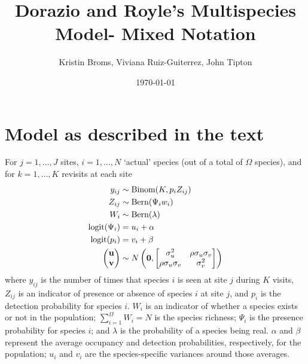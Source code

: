 \documentclass[fleqn]{article}
\title{Dorazio and Royle's Multispecies Model- Mixed Notation}
\author{Kristin Broms, Viviana Ruiz-Guiterrez, John Tipton}
\date{\today}
\begin{document}
%
\maketitle
%
\section{Model as described in the text}
%
For $j = 1, \ldots, J$ sites,  $i = 1, \ldots, N$ `actual' species (out of a total of $\Omega$ species), and for $k = 1, \ldots, K$ revisits at each site
%
%
\begin{align*}
  y_{ij} & \sim \mbox{Binom} (K, p_iZ_{ij}) \\
  Z_{ij} & \sim \mbox{Bern} (\Psi_iw_i) \\
  W_i & \sim \mbox{Bern} (\lambda) \\
  \mbox{logit} (\Psi_i) &= u_i + \alpha \\
    \mbox{logit} (p_i) & = v_i + \beta \\
  \begin{pmatrix}
     \bf{u} \\
     \bf{v} 
\end{pmatrix}
& \sim N\left( \bf{0}, \begin{bmatrix}  \sigma_u^2 & \rho\sigma_u\sigma_v \\
                                                                 \rho\sigma_u\sigma_v  & \sigma_v^2  \end{bmatrix}  \right)  \\
 \end{align*}
%
where $y_{ij}$ is the number of times that species $i$ is seen at site $j$ during $K$ visits, $Z_{ij}$ is an indicator of presence or absence of species $i$ at site $j$, and $p_i$ is the detection probability for species $i$.  $W_i$ is an indicator of whether a species exists or not in the population;  $\sum_{i = 1}^\Omega W_i = N$ is the species richness; $\Psi_i$ is the presence probability for species $i$; and $\lambda$ is the probability of a species being real. $\alpha$ and $\beta$ represent the average occupancy and detection probabilities, respectively, for the population; $u_i$ and $v_i$ are the species-specific variances around those averages.
\end{document}
